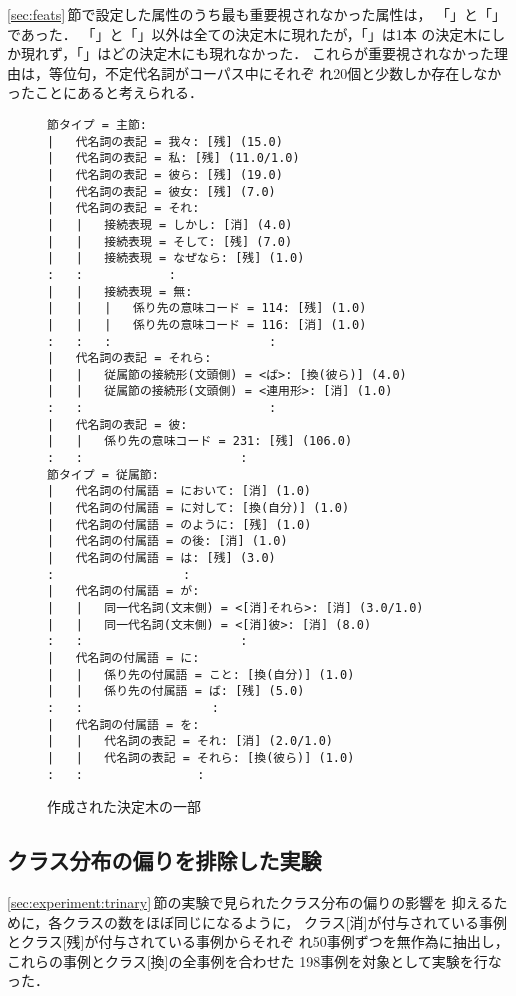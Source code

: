\ref{sec:feats}\,節で設定した属性のうち最も重要視されなかった属性は，
「\COORD」と「\INDEFPRON」であった．
「\COORD」と「\INDEFPRON」以外は全ての決定木に現れたが，「\COORD」は1本
の決定木にしか現れず，「\INDEFPRON」はどの決定木にも現れなかった．
これらが重要視されなかった理由は，等位句，不定代名詞がコーパス中にそれぞ
れ20個と少数しか存在しなかったことにあると考えられる．
\begin{figure}[tbhp]
\begin{DTREE}{0.9\textwidth}
\begin{verbatim}
節タイプ = 主節:
|   代名詞の表記 = 我々: [残] (15.0)
|   代名詞の表記 = 私: [残] (11.0/1.0)
|   代名詞の表記 = 彼ら: [残] (19.0)
|   代名詞の表記 = 彼女: [残] (7.0)
|   代名詞の表記 = それ:
|   |   接続表現 = しかし: [消] (4.0)
|   |   接続表現 = そして: [残] (7.0)
|   |   接続表現 = なぜなら: [残] (1.0)
:   :            :
|   |   接続表現 = 無:
|   |   |   係り先の意味コード = 114: [残] (1.0)
|   |   |   係り先の意味コード = 116: [消] (1.0)
:   :   :                      :
|   代名詞の表記 = それら:
|   |   従属節の接続形(文頭側) = <ば>: [換(彼ら)] (4.0)
|   |   従属節の接続形(文頭側) = <連用形>: [消] (1.0)
:   :                          :
|   代名詞の表記 = 彼:
|   |   係り先の意味コード = 231: [残] (106.0)
:   :                      :
節タイプ = 従属節:
|   代名詞の付属語 = において: [消] (1.0)
|   代名詞の付属語 = に対して: [換(自分)] (1.0)
|   代名詞の付属語 = のように: [残] (1.0)
|   代名詞の付属語 = の後: [消] (1.0)
|   代名詞の付属語 = は: [残] (3.0)
:                  :
|   代名詞の付属語 = が:
|   |   同一代名詞(文末側) = <[消]それら>: [消] (3.0/1.0)
|   |   同一代名詞(文末側) = <[消]彼>: [消] (8.0)
:   :                      :
|   代名詞の付属語 = に:
|   |   係り先の付属語 = こと: [換(自分)] (1.0)
|   |   係り先の付属語 = ば: [残] (5.0)
:   :                  :
|   代名詞の付属語 = を:
|   |   代名詞の表記 = それ: [消] (2.0/1.0)
|   |   代名詞の表記 = それら: [換(彼ら)] (1.0)
:   :                :
\end{verbatim}
\end{DTREE}
\caption{作成された決定木の一部}
\label{fig:d-tree}
\end{figure}

\subsection{クラス分布の偏りを排除した実験}
\label{sec:experiment:same_num_of_class}

\ref{sec:experiment:trinary}\,節の実験で見られたクラス分布の偏りの影響を
抑えるために，各クラスの数をほぼ同じになるように，
クラス[消]が付与されている事例とクラス[残]が付与されている事例からそれぞ
れ50事例ずつを無作為に抽出し，これらの事例とクラス[換]の全事例を合わせた
198事例を対象として実験を行なった．

